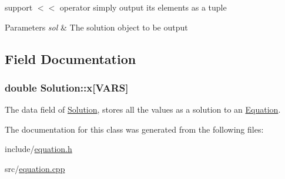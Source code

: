 support $<$$<$ operator simply output its elements as a tuple 


\begin{DoxyParams}{Parameters}
{\em sol} & The solution object to be output \\
\hline
\end{DoxyParams}


\subsection{Field Documentation}
\subsubsection[{x}]{\setlength{\rightskip}{0pt plus 5cm}double Solution\+::x\mbox{[}{\bf V\+A\+RS}\mbox{]}}\hypertarget{classSolution_a67672e91e753de458afef2ca270510dd}{}\label{classSolution_a67672e91e753de458afef2ca270510dd}


The data field of \hyperlink{classSolution}{Solution}, stores all the values as a solution to an \hyperlink{classEquation}{Equation}. 



The documentation for this class was generated from the following files\+:\begin{DoxyCompactItemize}
\item 
include/\hyperlink{equation_8h}{equation.\+h}\item 
src/\hyperlink{equation_8cpp}{equation.\+cpp}\end{DoxyCompactItemize}
